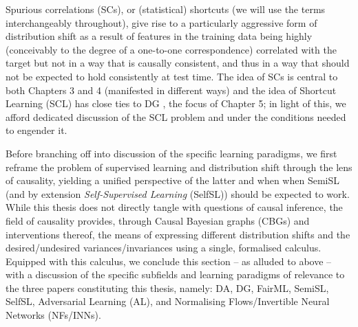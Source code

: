 %
Spurious correlations (SCs), or (statistical) shortcuts (we will use the terms interchangeably
throughout), give rise to a particularly aggressive form of distribution shift as a result of
features in the training data being highly (conceivably to the degree of a one-to-one
correspondence) correlated with the target but not in a way that is causally consistent, and thus
in a way that should not be expected to hold consistently at test time. 
%
The idea of SCs is central to both Chapters 3 and 4 (manifested in different ways) and the idea of
Shortcut Learning (SCL) has close ties to DG \citep{arjovsky2019invariant}, the focus of Chapter 5;
in light of this, we afford dedicated discussion of the SCL problem and under the conditions needed
to engender it.

%
Before branching off into discussion of the specific learning paradigms, we first reframe the
problem of supervised learning and distribution shift through the lens of causality, yielding a
unified perspective of the latter and when when SemiSL (and by extension \emph{Self-Supervised
Learning} (SelfSL)) should be expected to work.
%
While this thesis does not directly tangle with questions of causal inference, the field of
causality \citep{pearl2009causality} provides, through Causal Bayesian graphs (CBGs) and
interventions thereof, the means of expressing different distribution shifts and the
desired/undesired variances/invariances using a single, formalised calculus.
%
Equipped with this calculus, we conclude this section -- as alluded to above -- with a discussion
of the specific subfields and learning paradigms of relevance to the three papers constituting this
thesis, namely:  DA, DG, FairML, SemiSL, SelfSL, Adversarial Learning (AL), and Normalising
Flows/Invertible Neural Networks (NFs/INNs).

